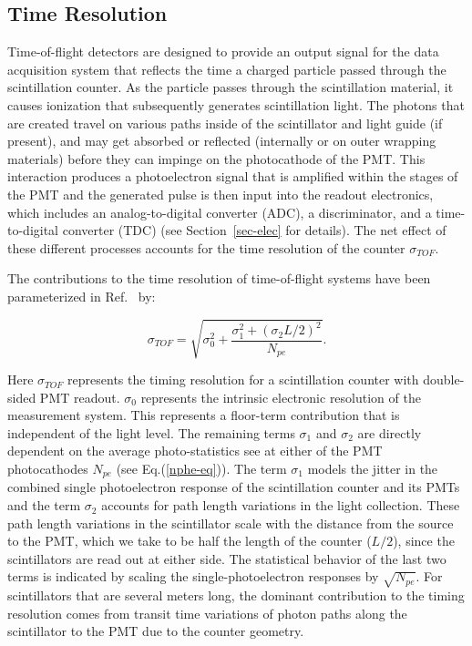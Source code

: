 \documentclass{elsart}
\begin{document}
\subsection{Time Resolution}
\label{res-sec}

Time-of-flight detectors are designed to provide an output signal for the data acquisition system that
reflects the time a charged particle passed through the scintillation counter. As the particle passes
through the scintillation material, it causes ionization that subsequently generates scintillation light. The
photons that are created travel on various paths inside of the scintillator and light guide (if present), and
may get absorbed or reflected (internally or on outer wrapping materials) before they can impinge on the
photocathode of the PMT. This interaction produces a photoelectron signal that is amplified within the
stages of the PMT and the generated pulse is then input into the readout electronics, which includes an
analog-to-digital converter (ADC), a discriminator, and a time-to-digital converter (TDC) (see
Section~\ref{sec-elec} for details). The net effect of these different processes accounts for the time
resolution of the counter $\sigma_{TOF}$.

The contributions to the time resolution of time-of-flight systems have been parameterized in Ref.~\cite{kuhlen}
by:

\begin{equation}
\label{timing-func}
\sigma_{TOF} = \sqrt{\sigma_0^2 + \frac{\sigma_1^2 + (\sigma_2 L/2)^2} {N_{pe}}}.
\end{equation}

Here $\sigma_{TOF}$ represents the timing resolution for a scintillation counter with double-sided PMT readout.
$\sigma_0$ represents the intrinsic electronic resolution of the measurement system. This represents a floor-term
contribution that is independent of the light level. The remaining terms $\sigma_1$ and $\sigma_2$ are directly
dependent on the average photo-statistics see at either of the PMT photocathodes $N_{pe}$ (see Eq.(\ref{nphe-eq})).
The term $\sigma_1$ models the jitter in the combined single photoelectron response of the scintillation counter and
its PMTs and the term $\sigma_2$ accounts for path length variations in the light collection.  These path length
variations in the scintillator scale with the distance from the source to the PMT, which we take to be half the length of
the counter ($L/2$), since the scintillators are read out at either side.  The statistical behavior of the last two terms
is indicated by scaling the single-photoelectron responses by $\sqrt{N_{pe}}$. For scintillators that are several meters
long, the dominant contribution to the timing resolution comes from transit time variations of photon paths along the
scintillator to the PMT due to the counter geometry.
\end{document}
